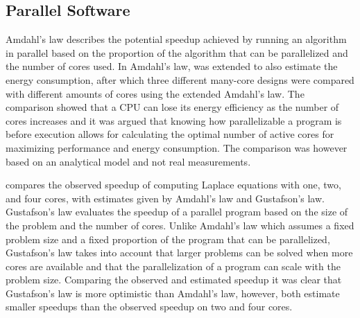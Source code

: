 \subsection{Parallel Software}

Amdahl's law describes the potential speedup achieved by running an algorithm in parallel based on the proportion of the algorithm that can be parallelized and the number of cores used.\cite{amdahl1967validity} In \cite{woo2008extending} Amdahl's law, was extended to also estimate the energy consumption, after which three different many-core designs were compared with different amounts of cores using the extended Amdahl's law. The comparison showed that a CPU can lose its energy efficiency as the number of cores increases and it was argued that knowing how parallelizable a program is before execution allows for calculating the optimal number of active cores for maximizing performance and energy consumption. The comparison was  however based on an analytical model and not real measurements.\cite{woo2008extending}

\cite{prinslow2011overview} compares the observed speedup of computing Laplace equations with one, two, and four cores, with estimates given by Amdahl's law and Gustafson's law.  Gustafson's law evaluates the speedup of a parallel program based on the size of the problem and the number of cores. Unlike Amdahl's law which assumes a fixed problem size and a fixed proportion of the program that can be parallelized, Gustafson's law takes into account that larger problems can be solved when more cores are available and that the parallelization of a program can scale with the problem size. Comparing the observed and estimated speedup it was clear that Gustafson's law is more optimistic than Amdahl's law, however, both estimate smaller speedups than the observed speedup on two and four cores. \cite{prinslow2011overview}


